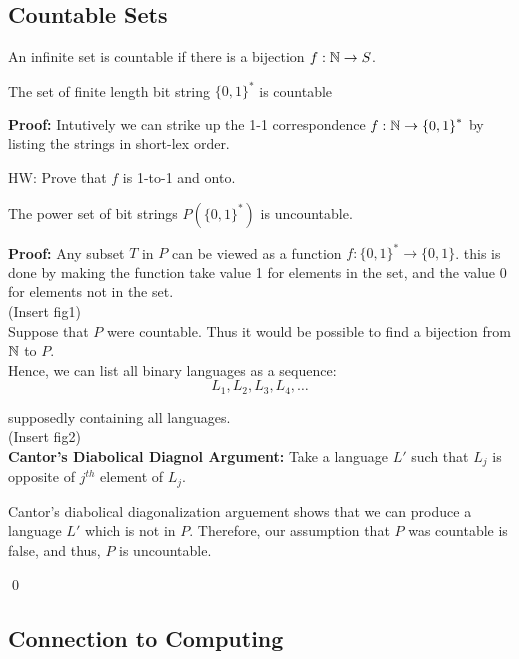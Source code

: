 \subsection{Countable Sets}

An infinite set is countable if there is a bijection $f: \mathbb{N}
\rightarrow S$. 

\begin{theorem}
    The set of finite length bit string ${\{0, 1\}}^{*}$
    is countable
\end{theorem}

\textbf{Proof:} Intutively we can strike up the 1-1 correspondence
$f: \mathbb{N} \rightarrow {\{0, 1\}}^{*}$ by listing the strings in
short-lex order.

HW: Prove that $f$ is 1-to-1 and onto.

\begin{theorem}
    The power set of bit strings $P({\{0, 1\}}^{*})$ is uncountable.
\end{theorem}

\textbf{Proof:} Any subset $T$ in $P$ can be viewed as a function
$f: {\{0, 1\}}^{*} \rightarrow \{0, 1\}$. this is done by making 
the function take value 1 for elements in the set, and the value 0
for elements not in the set.\\

(Insert fig1)\\

Suppose that $P$ were countable.
Thus it would be possible to find a bijection from $\mathbb{N}$ to $P$.\\

Hence, we can list all binary languages as a sequence:\\

$$
L_1, L_2, L_3, L_4, \dots
$$

supposedly containing all languages.\\

(Insert fig2)\\

\textbf{Cantor's Diabolical Diagnol Argument:} Take a language $L'$
such that $L_j$ is opposite of $j^{th}$ element of $L_j$.

Cantor's diabolical diagonalization arguement shows that we can 
produce a language $L'$ which is not in $P$. Therefore, our
assumption that $P$ was countable is false, and thus, $P$ is uncountable.

\qed

\subsection{Connection to Computing}

